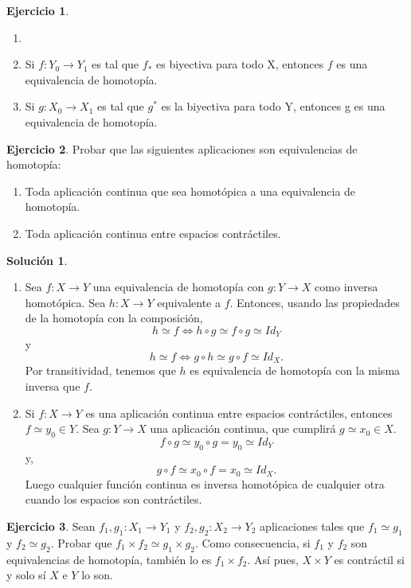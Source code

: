 \documentclass{article}
\theoremstyle{plain}
\theoremstyle{definition}
\newtheorem{exercise}{Ejercicio}
\newtheorem*{sol*}{Solución}
\begin{document}
\newpage
\begin{exercise}
\begin{enumerate}
\item[]
\item Si $f:Y_0\to Y_1$ es tal que $f_*$ es biyectiva para todo X, entonces $f$ es una equivalencia de homotopía.
\item Si $g:X_0\to X_1$ es tal que $g^*$ es la biyectiva para todo Y, entonces g es una equivalencia de homotopía.
\end{enumerate}
\end{exercise}
\newpage
\begin{exercise}
Probar que las siguientes aplicaciones son equivalencias de homotopía:
\begin{enumerate}
\item Toda aplicación continua que sea homotópica a una equivalencia de homotopía.
\item Toda aplicación continua entre espacios contráctiles.
\end{enumerate}
\end{exercise}
\begin{sol*}
\begin{enumerate}\
\item Sea $f:X\to Y$ una equivalencia de homotopía con $g:Y\to X$ como inversa homotópica. Sea $h:X\to Y$ equivalente a $f$. Entonces, usando las propiedades de la homotopía con la composición, 
\[
h\simeq f\Leftrightarrow h\circ g\simeq f\circ g\simeq Id_Y
\]
y
\[
h\simeq f\Leftrightarrow g\circ h\simeq g\circ f\simeq Id_X.
\]
Por transitividad, tenemos que $h$ es equivalencia de homotopía con la misma inversa que $f$. 
\item Si $f:X\to Y$ es una aplicación continua entre espacios contráctiles, entonces $f\simeq y_0\in Y$. Sea $g:Y\to X$ una aplicación continua, que cumplirá $g\simeq x_0\in X$. 
\[
f\circ g\simeq y_0\circ g = y_0\simeq Id_Y
\]
y,
\[
g\circ f\simeq x_0\circ f =x_0\simeq Id_X.
\]
Luego cualquier función continua es inversa homotópica de cualquier otra cuando los espacios son contráctiles. 
\end{enumerate}
\end{sol*}
\newpage
\begin{exercise}
Sean $f_1,g_1:X_1\to Y_1$ y $f_2,g_2:X_2\to Y_2$ aplicaciones tales que $f_1\simeq g_1$ y $f_2\simeq g_2$. Probar que $f_1\times f_2\simeq g_1\times g_2$. Como consecuencia, si $f_1$ y $f_2$ son equivalencias de homotopía, también lo es $f_1\times f_2$. Así pues, $X\times Y$ es contráctil si y solo sí $X$ e $Y$ lo son.
\end{exercise}
\end{document}
